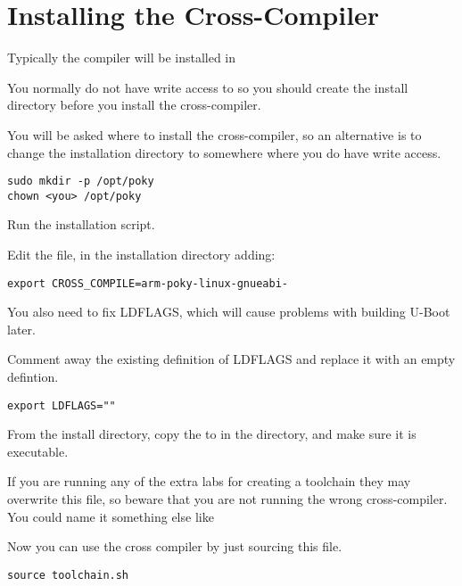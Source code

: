 \section{Installing the Cross-Compiler}

Typically the compiler will be installed in 

You normally do not have write access to  so you should
create the install directory before you install the cross-compiler.

You will be asked where to install the cross-compiler, so an alternative 
is to change the installation directory to somewhere where you do have write access.

\begin{verbatim}
sudo mkdir -p /opt/poky
chown <you> /opt/poky
\end{verbatim}

Run the installation script.

Edit the  file, 
in the installation directory adding:

\begin{verbatim}
export CROSS_COMPILE=arm-poky-linux-gnueabi-
\end{verbatim}

You also need to fix LDFLAGS, which will cause problems with building U-Boot later.

Comment away the existing definition of LDFLAGS and replace it with an empty defintion.

\begin{verbatim}
export LDFLAGS=""
\end{verbatim}

From the install directory, copy the 
 to
 in the \labdir directory, and make sure it is executable.

If you are running any of the extra labs for creating a toolchain
they may overwrite this file, so beware that you are not running
the wrong cross-compiler. You could name it something else like

Now you can use the cross compiler by just sourcing this file.

\begin{verbatim}
source toolchain.sh
\end{verbatim}

